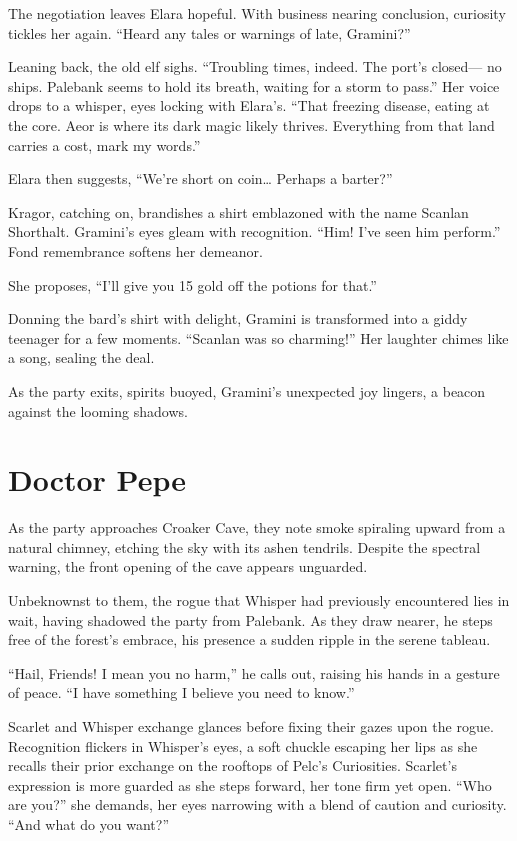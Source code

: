 \documentclass[
  letterpaper,12pt,twoside,twocolumn,openany,
  nodeprecatedcode,bg=full]{dndbook}
\begin{document}
The negotiation leaves Elara hopeful. With business nearing conclusion,
curiosity tickles her again. ``Heard any tales or warnings of late,
Gramini?''

Leaning back, the old elf sighs. ``Troubling times, indeed. The port's
closed--- no ships. Palebank seems to hold its breath, waiting for a
storm to pass.'' Her voice drops to a whisper, eyes locking with
Elara's. ``That freezing disease, eating at the core. Aeor is where its
dark magic likely thrives. Everything from that land carries a cost,
mark my words.''

Elara then suggests, ``We're short on coin\ldots{} Perhaps a barter?''

Kragor, catching on, brandishes a shirt emblazoned with the name Scanlan
Shorthalt. Gramini's eyes gleam with recognition. ``Him! I've seen him
perform.'' Fond remembrance softens her demeanor.

She proposes, ``I'll give you 15 gold off the potions for that.''

Donning the bard's shirt with delight, Gramini is transformed into a
giddy teenager for a few moments. ``Scanlan was so charming!'' Her
laughter chimes like a song, sealing the deal.

As the party exits, spirits buoyed, Gramini's unexpected joy lingers, a
beacon against the looming shadows.

\section{Doctor Pepe}\label{doctor-pepe}

As the party approaches Croaker Cave, they note smoke spiraling upward
from a natural chimney, etching the sky with its ashen tendrils. Despite
the spectral warning, the front opening of the cave appears unguarded.

Unbeknownst to them, the rogue that Whisper had previously encountered
lies in wait, having shadowed the party from Palebank. As they draw
nearer, he steps free of the forest's embrace, his presence a sudden
ripple in the serene tableau.

``Hail, Friends! I mean you no harm,'' he calls out, raising his hands
in a gesture of peace. ``I have something I believe you need to know.''

Scarlet and Whisper exchange glances before fixing their gazes upon the
rogue. Recognition flickers in Whisper's eyes, a soft chuckle escaping
her lips as she recalls their prior exchange on the rooftops of Pelc's
Curiosities. Scarlet's expression is more guarded as she steps forward,
her tone firm yet open. ``Who are you?'' she demands, her eyes narrowing
with a blend of caution and curiosity. ``And what do you want?''
\end{document}
